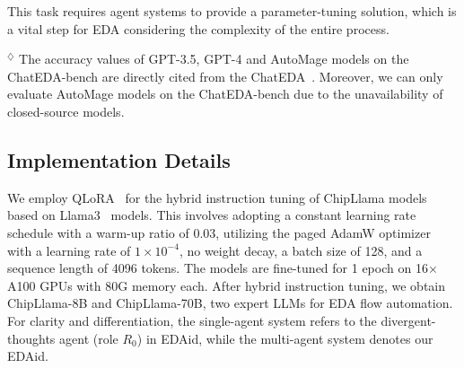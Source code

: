 This task requires agent systems to provide a parameter-tuning solution, which is a vital step for EDA considering the complexity of the entire process.

\begin{table}[!t]
\centering
\begin{tablenotes}[flushleft] \tiny
\item$^\diamondsuit$ The accuracy values of GPT-3.5, GPT-4 and AutoMage models on the ChatEDA-bench are directly cited from the ChatEDA~\cite{wu2024chateda}.
Moreover, we can only evaluate AutoMage models on the ChatEDA-bench due to the unavailability of closed-source models.
\end{tablenotes} 
\caption{The main results of EDA script generation on ChatEDA-bench~\cite{wu2024chateda} and iEDA-bench.}
\label{table:scripteval}
\end{table}

\subsection{Implementation Details} 
We employ QLoRA~\cite{dettmers2024qlora} for the hybrid instruction tuning of ChipLlama models based on Llama3~\cite{dubey2024llama3} models. 
This involves adopting a constant learning rate schedule with a warm-up ratio of 0.03, utilizing the paged AdamW optimizer~\cite{dettmers20218bit} with a learning rate of $1 \times 10^{-4}$, no weight decay, a batch size of 128, and a sequence length of 4096 tokens. 
The models are fine-tuned for 1 epoch on 16$\times$A100 GPUs with 80G memory each.
After hybrid instruction tuning, we obtain ChipLlama-8B and ChipLlama-70B, two expert LLMs for EDA flow automation.
For clarity and differentiation, the single-agent system refers to the divergent-thoughts agent (role $R_{0}$) in EDAid, while the multi-agent system denotes our EDAid. 

